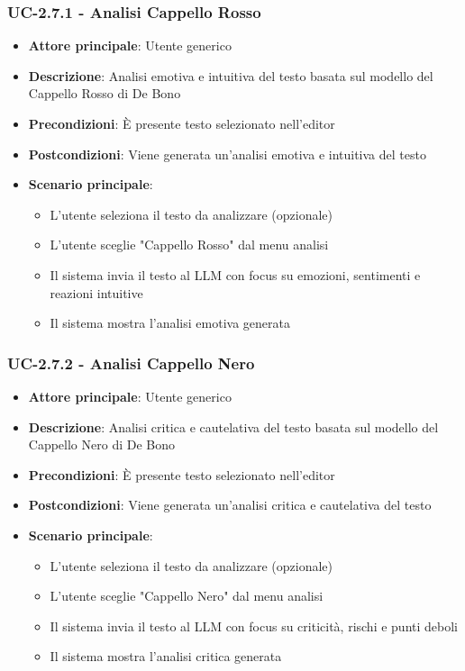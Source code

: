 \documentclass[11pt,a4paper]{article}
\begin{document}
\subsubsection{UC-2.7.1 - Analisi Cappello Rosso}
\begin{itemize}
    \item \textbf{Attore principale}: Utente generico
    \item \textbf{Descrizione}: Analisi emotiva e intuitiva del testo basata sul modello del Cappello Rosso di De Bono
    \item \textbf{Precondizioni}: È presente testo selezionato nell'editor
    \item \textbf{Postcondizioni}: Viene generata un'analisi emotiva e intuitiva del testo
    \item \textbf{Scenario principale}:
        \begin{itemize}
            \item L'utente seleziona il testo da analizzare (opzionale)
            \item L'utente sceglie "Cappello Rosso" dal menu analisi
            \item Il sistema invia il testo al LLM con focus su emozioni, sentimenti e reazioni intuitive
            \item Il sistema mostra l'analisi emotiva generata
        \end{itemize}
\end{itemize}

\subsubsection{UC-2.7.2 - Analisi Cappello Nero}
\begin{itemize}
    \item \textbf{Attore principale}: Utente generico
    \item \textbf{Descrizione}: Analisi critica e cautelativa del testo basata sul modello del Cappello Nero di De Bono
    \item \textbf{Precondizioni}: È presente testo selezionato nell'editor
    \item \textbf{Postcondizioni}: Viene generata un'analisi critica e cautelativa del testo
    \item \textbf{Scenario principale}:
        \begin{itemize}
            \item L'utente seleziona il testo da analizzare (opzionale)
            \item L'utente sceglie "Cappello Nero" dal menu analisi
            \item Il sistema invia il testo al LLM con focus su criticità, rischi e punti deboli
            \item Il sistema mostra l'analisi critica generata
        \end{itemize}
\end{itemize}
\end{document}
